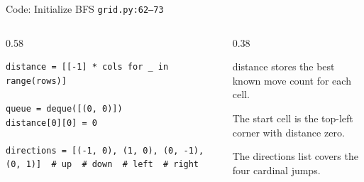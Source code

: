 \documentclass[aspectratio=169,11pt]{beamer}
\begin{document}
\begin{frame}[fragile]{Code: Initialize BFS}
\scriptsize
{} \texttt{grid.py:62--73}

\vspace{0.08cm}
\begin{columns}[T,totalwidth=\textwidth]
\begin{column}{0.58\textwidth}
\begin{lstlisting}[style=cpcode]
distance = [[-1] * cols for _ in range(rows)]

queue = deque([(0, 0)])
distance[0][0] = 0

directions = [(-1, 0), (1, 0), (0, -1), (0, 1)]  # up  # down  # left  # right
\end{lstlisting}
\end{column}
\begin{column}{0.38\textwidth}
\begin{tightitemize}
  \item distance stores the best known move count for each cell.
  \item The start cell is the top-left corner with distance zero.
  \item The directions list covers the four cardinal jumps.
\end{tightitemize}
\end{column}
\end{columns}
\end{frame}
\end{document}
